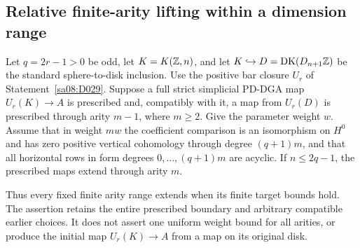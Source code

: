 \subsection{Relative finite-arity lifting within a dimension range}

\begin{theorem}
\label{sa08:C29}
Let $q=2r-1>0$ be odd, let $K=K(\mathbb Z,n)$, and let
$K\hookrightarrow D=\mathrm{DK}(D_{n+1}\mathbb Z)$ be the standard
sphere-to-disk inclusion. Use the positive bar closure $U_r$ of
Statement~\ref{sa08:D029}. Suppose a full strict simplicial PD-DGA
map $U_r(K)\to A$ is prescribed and, compatibly with it, a map
from $U_r(D)$ is prescribed through arity $m-1$, where $m\geq2$.
Give the parameter weight $w$. Assume that in weight $mw$ the
coefficient comparison is an isomorphism on $H^0$ and has zero
positive vertical cohomology through degree $(q+1)m$, and that
all horizontal rows in form degrees $0,\ldots,(q+1)m$ are acyclic.
If $n\leq2q-1$, the prescribed maps extend through arity $m$.

Thus every fixed finite arity range extends when its finite target
bounds hold. The assertion retains the entire prescribed boundary
and arbitrary compatible earlier choices. It does not assert one
uniform weight bound for all arities, or produce the initial map
$U_r(K)\to A$ from a map on its original disk.
\end{theorem}
